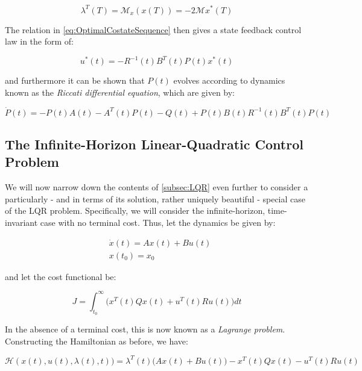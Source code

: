 \begin{equation}\label{eq:PontryaginBoundaryCondition}
	\lambda^T(T) = \mathcal{M}_x(x(T)) = -2\mathcal{M}x^*(T)
\end{equation}

The relation in \cref{eq:OptimalCostateSequence} then gives a state feedback control law in the form of:

\begin{equation}\label{eq:LQRFeedbackLaw}
	u^*(t) = -R^{-1}(t)B^T(t)P(t)x^*(t)
\end{equation}

and furthermore it can be shown that $P(t)$ evolves according to dynamics known as the \textit{Riccati differential equation}, which are given by:

\begin{equation}\label{eq:RDE}
	\dot{P}(t) = -P(t)A(t) - A^T(t)P(t) - Q(t) + P(t)B(t)R^{-1}(t)B^T(t)P(t)
\end{equation}

\subsection{The Infinite-Horizon Linear-Quadratic Control Problem}\label{subsec:InfiniteHorizonLQR}

We will now narrow down the contents of \cref{subsec:LQR} even further to consider a particularly - and in terms of its solution, rather uniquely beautiful - special case of the LQR problem. Specifically, we will consider the infinite-horizon, time-invariant case with no terminal cost. Thus, let the dynamics be given by:

\begin{align}
	&\dot{x}(t) = Ax(t) + Bu(t) \label{eq:InvariantLinearSystem} \\
	&x(t_0) = x_0
\end{align}

and let the cost functional be:

\begin{equation}\label{eq:LagrangeProblem}
 J = \int_{t_0}^{\infty} \big(x^T(t)Qx(t) + u^T(t)Ru(t)\big)dt
\end{equation} 

In the absence of a terminal cost, this is now known as a \textit{Lagrange problem}. Constructing the Hamiltonian as before, we have:

\begin{equation}\label{eq:InfLQRHamiltonian}
	\mathcal{H}(x(t),u(t),\lambda(t),t)) = \lambda^T(t)\big(Ax(t) + Bu(t)\big) - x^T(t)Qx(t) - u^T(t)Ru(t)
\end{equation}

